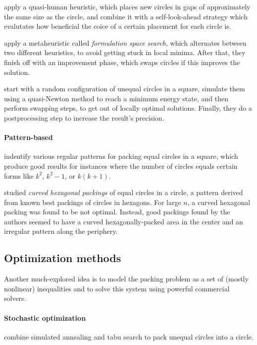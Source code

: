 \documentclass[a4paper,style=print,oneside,bibliography=totoc,nexus,lnum,extramargin]{tubsbook}
\begin{document}
\textcite{HLLX2006new} apply a quasi-human heuristic, which places new circles in gaps of approximately the same size as the circle, and combine it with a self-look-ahead strategy which evalutates how beneficial the coice of a certain placement for each circle is.

\textcite{LB2013packing} apply a metaheuristic called \emph{formulation space search}, which alternates between two different heuristics, to avoid getting stuck in local minima. After that, they finish off with an improvement phase, which swaps circles if this improves the solution.

\textcite{HHY2015action} start with a random configuration of unequal circles in a square, simulate them using a quasi-Newton method to reach a minimum energy state, and then perform swapping steps, to get out of locally optimal solutions. Finally, they do a postprocessing step to increase the result's precision.

\paragraph{Pattern-based}

\textcite{GL1996repeated} indentify various regular patterns for packing equal circles in a square, which produce good results for instances where the number of circles equals certain forms like $k^2$, $k^2-1$, or $k(k+1)$.

\textcite{lubachevsky1997curved} studied \emph{curved hexagonal packings} of equal circles in a circle, a pattern derived from known best packings of circles in hexagons. For large $n$, a curved hexagonal packing was found to be not optimal. Instead, good packings found by the authors seemed to have a curved hexagonally-packed area in the center and an irregular pattern along the periphery.

\subsection{Optimization methods}

Another much-explored idea is to model the packing problem as a set of (mostly nonlinear) inequalities and to solve this system using powerful commercial solvers.

\paragraph{Stochastic optimization}

\textcite{ZD2005effective} combine simulated annealing and tabu search to pack unequal circles into a circle.
\end{document}
